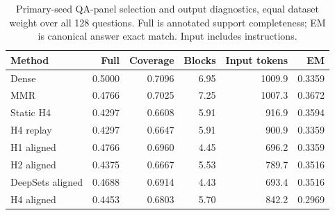 \begin{table}[t]\centering\small
\caption{Primary-seed QA-panel selection and output diagnostics, equal dataset weight over all 128 questions. Full is annotated support completeness; EM is canonical answer exact match. Input includes instructions.}
\label{tab:qa-details}
\begin{tabular}{lrrrrr}\toprule
Method & Full & Coverage & Blocks & Input tokens & EM\\\midrule
Dense & 0.5000 & 0.7096 & 6.95 & 1009.9 & 0.3359\\
MMR & 0.4766 & 0.7025 & 7.25 & 1007.3 & 0.3672\\
Static H4 & 0.4297 & 0.6608 & 5.91 & 916.9 & 0.3594\\
H4 replay & 0.4297 & 0.6647 & 5.91 & 900.9 & 0.3359\\
H1 aligned & 0.4766 & 0.6960 & 4.45 & 696.2 & 0.3359\\
H2 aligned & 0.4375 & 0.6667 & 5.53 & 789.7 & 0.3516\\
DeepSets aligned & 0.4688 & 0.6914 & 4.43 & 693.4 & 0.3516\\
H4 aligned & 0.4453 & 0.6803 & 5.70 & 842.2 & 0.2969\\
\bottomrule\end{tabular}\end{table}
